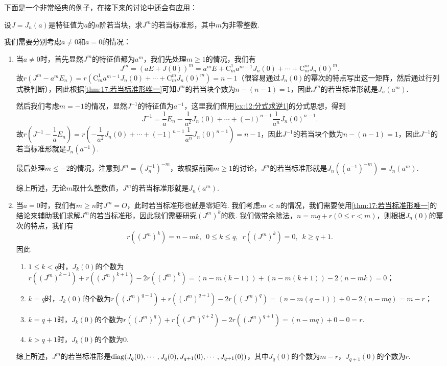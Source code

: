 下面是一个非常经典的例子，在接下来的讨论中还会有应用：
\begin{example} \label{ex:17:若当m次幂}
    设$J=J_n(a)$是特征值为$a$的$n$阶若当块，求$J^m$的若当标准形，其中$m$为非零整数.
\end{example}
\begin{solution}
    我们需要分别考虑$a\neq 0$和$a=0$的情况：
    \begin{enumerate}
        \item 当$a\neq 0$时，首先显然$J^m$的特征值都为$a^m$，我们先处理$m\geqslant 1$的情况，我们有
        \[J^m=(aE+J(0))^m=a^mE+\mathrm{C}_m^1a^{m-1}J_n(0)+\cdots+\mathrm{C}_m^mJ_n(0)^m.\]
        故$r(J^m-a^mE_n)=r(\mathrm{C}_m^1a^{m-1}J_n(0)+\cdots+\mathrm{C}_m^mJ_n(0)^m)=n-1$（很容易通过$J_n(0)$的幂次的特点写出这一矩阵，然后通过行列式秩判断），因此根据\autoref{thm:17:若当标准形唯一}可知$J^m$的若当块个数为$n-(n-1)=1$，因此$J^m$的若当标准形就是$J_n(a^m)$.

        然后我们考虑$m=-1$的情况，显然$J^{-1}$的特征值为$a^{-1}$，这里我们借用\autoref{ex:12:分式求逆1}的分式思想，得到
        \[J^{-1}=\dfrac{1}{a}E_n-\dfrac{1}{a^2}J_n(0)+\cdots+(-1)^{n-1}\dfrac{1}{a^n}J_n(0)^{n-1}.\]
        故$r(J^{-1}-\dfrac{1}{a}E_n)=r(-\dfrac{1}{a^2}J_n(0)+\cdots+(-1)^{n-1}\dfrac{1}{a^n}J_n(0)^{n-1})=n-1$，因此$J^{-1}$的若当块个数为$n-(n-1)=1$，因此$J^{-1}$的若当标准形就是$J_n(a^{-1})$.

        最后处理$m\leqslant -2$的情况，注意到$J^m=(J_n^{-1})^{-m}$，故根据前面$m\geqslant 1$的讨论，$J^m$的若当标准形就是$J_n((a^{-1})^{-m})=J_n(a^m)$.

        综上所述，无论$m$取什么整数值，$J^m$的若当标准形就是$J_n(a^m)$.

        \item 当$a=0$时，我们有$m\geqslant n$时$J^m=O$，此时若当标准形也就是零矩阵. 我们考虑$m<n$的情况，我们需要使用\autoref{thm:17:若当标准形唯一}的结论来辅助我们求解$J^m$的若当标准形，因此我们需要研究$(J^m)^k$的秩. 我们做带余除法，$n=mq+r(0\leqslant r<m)$，则根据$J_n(0)$的幂次的特点，我们有
        \[r((J^m)^k)=n-mk,\enspace 0\leqslant k\leqslant q,\enspace r((J^m)^k)=0,\enspace k\geqslant q+1.\]
        因此
        \begin{enumerate}
            \item $1\leqslant k<q$时，$J_k(0)$的个数为$r((J^m)^{k-1})+r((J^m)^{k+1})-2r((J^m)^k)=(n-m(k-1))+(n-m(k+1))-2(n-mk)=0$；
            \item $k=q$时，$J_k(0)$的个数为$r((J^m)^{q-1})+r((J^m)^{q+1})-2r((J^m)^q)=(n-m(q-1))+0-2(n-mq)=m-r$；
            \item $k=q+1$时，$J_k(0)$的个数为$r((J^m)^q)+r((J^m)^{q+2})-2r((J^m)^{q+1})=(n-mq)+0-0=r$.
            \item $k>q+1$时，$J_k(0)$的个数为0.
        \end{enumerate}
        综上所述，$J^m$的若当标准形是$\operatorname{diag}(J_q(0),\cdots,J_q(0),J_{q+1}(0),\cdots,J_{q+1}(0))$，其中$J_q(0)$的个数为$m-r$，$J_{q+1}(0)$的个数为$r$.
    \end{enumerate}
\end{solution}

